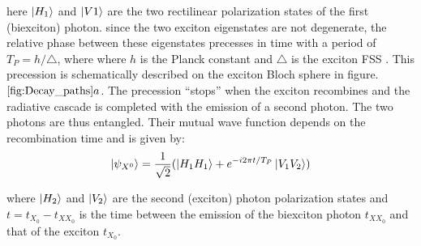 	here $\ket{H_1}$ and $\ket{V1}$ are the two rectilinear polarization states of the first (biexciton) photon. since the two exciton eigenstates are not degenerate, the relative phase between these eigenstates precesses in time with a period of $T_P = h/\triangle$, where where $h$ is the Planck constant and $\triangle$ is the exciton FSS \cite{rwinik2017}.
	This precession is schematically described on the exciton Bloch sphere in figure. $\ref{fig:Decay_paths}a$.
	The precession “stops” when the exciton recombines and the radiative cascade is completed with the emission of a second photon. The two photons are thus entangled. Their mutual wave function depends on the recombination time and is given by:
	\begin{equation}
		\ket{\psi_{X^0}} = \frac{1}{\sqrt{2}}(\ket{H_1H_1} +e^{-i2\pi t/T_P}\ket{V_1V_2})
	\end{equation}
 
	where $\ket{H_2}$ and $\ket{V_2}$ are the second (exciton) photon polarization states and $t = t_{X_0} - t_{{XX}_0}$ is the time between the emission of the biexciton photon $t_{{XX}_0}$ and that of the exciton $t_{X_0}$.